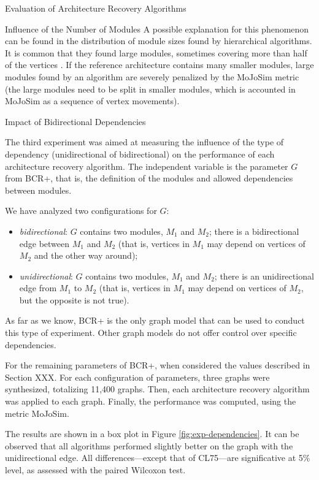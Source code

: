 \documentclass[11pt,twocolumn,a4paper,english]{article}
\begin{document}
\begin{section}{Evaluation of Architecture Recovery Algorithms}
\begin{subsection}{Influence of the Number of Modules}
	A possible explanation for this phenomenon can be found in the distribution of module sizes found by hierarchical algorithms. It is common that they found large modules, sometimes covering more than half of the vertices \cite{Wu2005}. If the reference architecture contains many smaller modules, large modules found by an algorithm are severely penalized by the MoJoSim metric (the large modules need to be split in smaller modules, which is accounted in MoJoSim as a sequence of vertex movements).
	
\end{subsection}

\begin{subsection}{Impact of Bidirectional Dependencies}
	
	The third experiment was aimed at measuring the influence of the type of dependency (unidirectional of bidirectional) on the performance of each architecture recovery algorithm. The independent variable is the parameter $G$ from BCR+, that is, the definition of the modules and allowed dependencies between modules.
	
	We have analyzed two configurations for $G$:
	
	\begin{itemize}
		\item \emph{bidirectional}: $G$ contains two modules, $M_1$ and $M_2$; there is a bidirectional edge between $M_1$ and $M_2$ (that is, vertices in $M_1$ may depend on vertices of $M_2$ and the other way around);
		
		\item \emph{unidirectional}: $G$ contains two modules, $M_1$ and $M_2$; there is an unidirectional edge from $M_1$ to $M_2$ (that is, vertices in $M_1$ may depend on vertices of $M_2$, but the opposite is not true).
	\end{itemize}
	
	As far as we know, BCR+ is the only graph model that can be used to conduct this type of experiment. Other graph models do not offer control over specific dependencies.
	
	For the remaining parameters of BCR+, when considered the values described in Section XXX. For each configuration of parameters, three graphs were synthesized, totalizing 11,400 graphs. Then, each architecture recovery algorithm was applied to each graph. Finally, the performance was computed, using the metric MoJoSim.
	
	The results are shown in a box plot in Figure \ref{fig:exp-dependencies}. It can be observed that all algorithms performed slightly better on the graph with the unidirectional edge. All differences---except that of CL75---are significative at 5\% level, as assessed with the paired Wilcoxon test.
	

\end{subsection}
\end{section}
\end{document}
